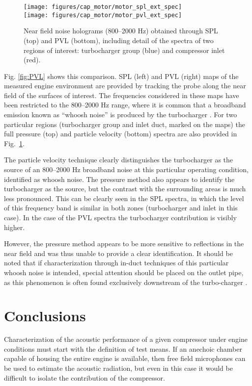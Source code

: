 \begin{figure}[tb!]
\centering
\texttt{[image: figures/cap\_motor/motor\_spl\_ext\_spec]}\\[5mm]
\texttt{[image: figures/cap\_motor/motor\_pvl\_ext\_spec]}
\caption{Near field noise holograms (800--2000 Hz) obtained through SPL (top) and PVL (bottom), including detail of the spectra of two regions of interest: turbocharger group (blue) and compressor inlet (red).}
\label{fig:PVL_spec_ext}
\end{figure}

Fig. \ref{fig:PVL} shows this comparison. SPL (left) and PVL (right) maps of the measured engine environment are provided by tracking the probe along the near field of the surfaces of interest. The frequencies considered in these maps have been restricted to the 800--2000 Hz range, where it is common that a broadband emission known as ``whoosh noise'' is produced by the turbocharger \cite{evans2005minimizing}. For two particular regions (turbocharger group and inlet duct, marked on the maps) the full pressure (top) and particle velocity (bottom) spectra are also provided in Fig.~\ref{fig:PVL_spec_ext}.

The particle velocity technique clearly distinguishes the turbocharger as the source of an 800--2000 Hz broadband noise at this particular operating condition, identified as whoosh noise. The pressure method also appears to identify the turbocharger as the source, but the contrast with the surrounding areas is much less pronounced. This can be clearly seen in the SPL spectra, in which the level of this frequency band is similar in both zones (turbocharger and inlet in this case). In the case of the PVL spectra the turbocharger contribution is visibly higher.

However, the pressure method appears to be more sensitive to reflections in the near field and was thus unable to provide a clear identification. It should be noted that if characterization through in-duct techniques of this particular whoosh noise is intended, special attention should be placed on the outlet pipe, as this phenomenon is often found exclusively downstream of the turbo-charger \cite{broatch2014methodology}.

\section{Conclusions}
\label{sec:motor_conclusions}

Characterization of the acoustic performance of a given compressor under engine conditions must start with the definition of test means. If an anechoic chamber capable of housing the entire engine is available, then free field microphones can be used to estimate the acoustic radiation, but even in this case it would be difficult to isolate the contribution of the compressor.

